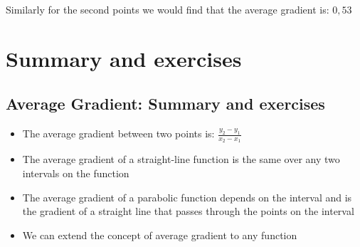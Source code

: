Similarly for the second points we would find that the average gradient is: $0,53$
\par 
\label{m39223**end}
         \section{ Summary and exercises}
    \nopagebreak
\label{m39240*eip-479}
            \subsection{ Average Gradient: Summary and exercises}
            \nopagebreak
\label{m39240*eip-922}\begin{itemize}[noitemsep]
            \item The average gradient between two points is: $\frac{{y}_{2}-{y}_{1}}{{x}_{2}-{x}_{1}}$\item The average gradient of a straight-line function is the same over any two intervals on the function\item The average gradient of a parabolic function depends on the interval and is the gradient of a straight line that passes through the points on the interval\item We can extend the concept of average gradient to any function\end{itemize}
        \label{m39240*cid5}
